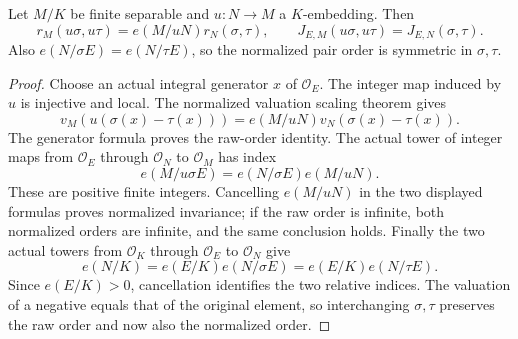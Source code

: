 \begin{lemma}
\label{fw:embedding-pair-ambient-invariance}
\leanok
Let $M/K$ be finite separable and $u:N\longrightarrow M$ a
$K$-embedding. Then
\[
 r_M(u\sigma,u\tau)=e(M/uN)r_N(\sigma,\tau),\qquad
 J_{E,M}(u\sigma,u\tau)=J_{E,N}(\sigma,\tau).
\]
Also $e(N/\sigma E)=e(N/\tau E)$, so the normalized pair order
is symmetric in $\sigma,\tau$.
\end{lemma}
\begin{proof}
Choose an actual integral generator $x$ of $\mathcal O_E$.
The integer map induced by $u$ is injective and local. The
normalized valuation scaling theorem gives
\[
 v_M(u(\sigma(x)-\tau(x)))
 =e(M/uN)v_N(\sigma(x)-\tau(x)).
\]
The generator formula proves the raw-order identity. The actual
tower of integer maps from $\mathcal O_E$ through
$\mathcal O_N$ to $\mathcal O_M$ has index
\[
 e(M/u\sigma E)=e(N/\sigma E)e(M/uN).
\]
These are positive finite integers. Cancelling $e(M/uN)$ in the
two displayed formulas proves normalized invariance; if the raw
order is infinite, both normalized orders are infinite, and the
same conclusion holds. Finally the two actual towers from
$\mathcal O_K$ through $\mathcal O_E$ to $\mathcal O_N$ give
\[
 e(N/K)=e(E/K)e(N/\sigma E)
       =e(E/K)e(N/\tau E).
\]
Since $e(E/K)>0$, cancellation identifies the two relative indices.
The valuation of a negative equals that of the original element,
so interchanging $\sigma,\tau$ preserves the raw order and now
also the normalized order.
\end{proof}

